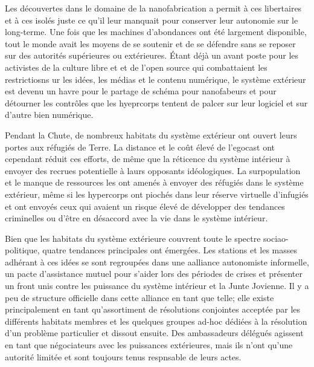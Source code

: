 Les découvertes dans le domaine de la nanofabrication a permit à ces libertaires et à ces isolés juste ce qu'il leur manquait pour conserver leur autonomie sur le long-terme. Une fois que les machines d'abondances ont été largement disponible, tout le monde avait les moyens de se soutenir et de se défendre sans se reposer sur des autorités supérieures ou extérieures. Étant déjà un avant poste pour les activistes de la culture libre et et de l'open source qui combattaient les restrictiosns ur les idées, les médias et le contenu numérique, le système extérieur est devenu un havre pour le partage de schéma pour nanofabeurs et pour détourner les contrôles que les hyeprcorps tentent de palcer sur leur logiciel et sur d'autre bien numérique. 

Pendant la Chute, de nombreux habitats du système extérieur ont ouvert leurs portes aux réfugiés de Terre. La distance et le coût élevé de l'egocast ont cependant réduit ces efforts, de même que la réticence du système intérieur à envoyer des recrues potentielle à laurs opposants idéologiques. La surpopulation et le manque de ressources les ont amenés à envoyer des réfugiés dans le système extérieur, même si les hypercorps ont piochés dans leur réserve virtuelle d'infugiés et ont envoyés ceux qui avaient un risque élevé de développer des tendances criminelles ou d'être en désaccord avec la vie dans le système intérieur. 

Bien que les habitats du système extérieure couvrent toute le spectre sociao-politique, quatre tendances principales ont émergées. Les stations et les masses adhérant à ces idées se sont regroupées dans une aalliance autonomiste informelle, un pacte d'assistance mutuel pour s'aider lors des périodes de crises et présenter un front unis contre les puissance du système intérieur et la Junte Jovienne. Il y a peu de structure officielle dans cette alliance en tant que telle; elle existe principalement en tant qu'assortiment de résolutions conjointes acceptée par les différents habitats membres et les quelques groupes ad-hoc dédiées à la résolution d'un problème particulier et dissout ensuite. Des ambassadeurs délégués agissent en tant que négociateurs avec les puissances extérieures, mais ils n'ont qu'une autorité limitée et sont toujours tenus respnsable de leurs actes. 

